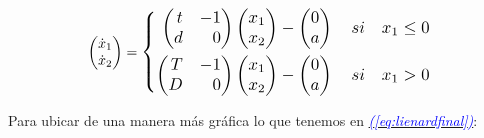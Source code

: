 \documentclass[12pt,a4paper]{report} %
\newcommand{\eref}[1]{\hyperref[#1]{\textcolor{blue}{\textit{(\ref*{#1})}}}}
\begin{document}
	
	\begin{equation}
		\begin{pmatrix*}[r]
			\dot{x}_1 \\ \dot{x}_2
		\end{pmatrix*}=
		\label{eq:lienardfinal}
		\scalebox{1.2}{$\displaystyle
			\left\{
			\begin{aligned}
				\begin{pmatrix*}[r]
					t & -1\\
					d & 0
				\end{pmatrix*}\begin{pmatrix*}[r]
					x_1 \\ x_2
				\end{pmatrix*}-\begin{pmatrix}
					0\\a
				\end{pmatrix} \quad si \quad x_1\leq 0 \\
				\begin{pmatrix*}[r]
					T & -1\\
					D & 0
				\end{pmatrix*}\begin{pmatrix*}[r]
					x_1 \\ x_2
				\end{pmatrix*}-\begin{pmatrix}
					0\\a
				\end{pmatrix} \quad si \quad x_1 > 0
			\end{aligned}
			\right. 
			$}
	\end{equation}\smallskip
	
	\noindent Para ubicar de una manera más gráfica lo que tenemos en \eref{eq:lienardfinal}:
	
\end{document}
